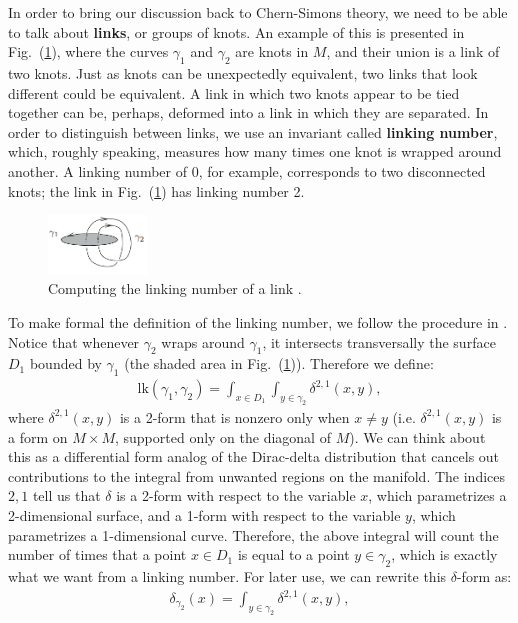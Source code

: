 \documentclass[12pt]{article}
\begin{document}
In order to bring our discussion back to Chern-Simons theory, we need to be able to talk about \textbf{links}, or groups of knots. An example of this is presented in Fig.~(\ref{fig:ln}), where the curves $\gamma_1$ and $\gamma_2$ are knots in $M$, and their union is a link of two knots. Just as knots can be unexpectedly equivalent, two links that look different could be equivalent. A link in which two knots appear to be tied together can be, perhaps, deformed into a link in which they are separated. In order to distinguish between links, we use an invariant called \textbf{linking number}, which, roughly speaking, measures how many times one knot is wrapped around another. A linking number of 0, for example, corresponds to two disconnected knots; the link in Fig.~(\ref{fig:ln}) has linking number 2.

\begin{figure}[h]
	\centering
	\includegraphics[width=100px]{knot_linking.png}
    \caption{Computing the linking number of a link \cite{infinite}.}
    \label{fig:ln}
\end{figure}
To make formal the definition of the linking number, we follow the procedure in \cite{infinite}. Notice that whenever $\gamma_2$ wraps around $\gamma_1$, it intersects transversally the surface $D_1$ bounded by $\gamma_1$ (the shaded area in Fig.~(\ref{fig:ln})). Therefore we define:
\begin{align*}
\text{lk}(\gamma_1, \gamma_2) = \int_{x\in D_1} \int_{y\in \gamma_2} \delta^{2,1} (x,y),
\end{align*}
where $\delta^{2,1}(x,y)$ is a 2-form that is nonzero only when $x\neq y$ (i.e. $\delta^{2,1} (x,y)$ is a form on $M\times M$, supported only on the diagonal of $M$). We can think about this as a differential form analog of the Dirac-delta distribution that cancels out contributions to the integral from unwanted regions on the manifold. The indices $2,1$ tell us that $\delta$ is a 2-form with respect to the variable $x$, which parametrizes a 2-dimensional surface, and a 1-form with respect to the variable $y$, which parametrizes a 1-dimensional curve. Therefore, the above integral will count the number of times that a point $x\in D_1$ is equal to a point $y\in \gamma_2$, which is exactly what we want from a linking number. For later use, we can rewrite this $\delta$-form as:
\begin{align}
\delta_{\gamma_2}(x) = \int_{y\in \gamma_2} \delta^{2,1}(x,y),
\label{eq:dgam}
\end{align}
\end{document}
